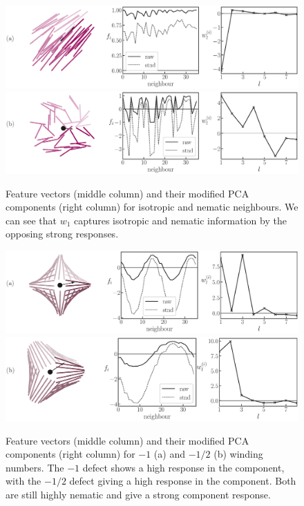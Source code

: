 \begin{figure}[!t]
\centering
\begin{minipage}[c]{\columnwidth}
	\centering
	\includegraphics[width=\columnwidth]{./figs/prob_stats_nem.eps}\\
	\vspace{0.5cm}
	\includegraphics[width=\columnwidth]{./figs/prob_stats_iso.eps}	\end{minipage}%
	\caption{Feature vectors (middle column) and their modified PCA components (right column) for isotropic and nematic neighbours. We can see that $w_1$ captures isotropic and nematic information by the opposing strong responses.
}
\label{FIG:prob_samples3}
\end{figure}

\begin{figure}[!t]
\centering
\begin{minipage}[c]{\columnwidth}
	\centering
	\includegraphics[width=\columnwidth]{./figs/prob_stats_minusone_small_0.eps}\\
	\vspace{0.5cm}
	\includegraphics[width=\columnwidth]{./figs/prob_stats_minushalf_small_0.eps}
\end{minipage}%
\caption{Feature vectors (middle column) and their modified PCA components (right column) for $-1$ (a) and $-1/2$ (b) winding numbers. The $-1$ defect shows a high response in the  component, with the $-1/2$ defect giving a high response in the  component. Both are still highly nematic and give a strong  component response.
}
\label{FIG:prob_samples1}
\end{figure}

